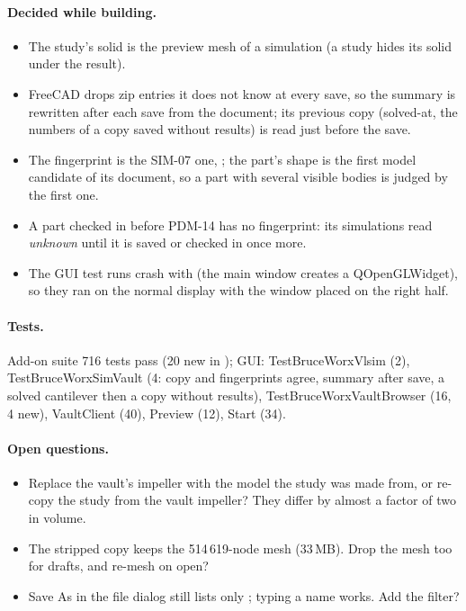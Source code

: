 \paragraph{Decided while building.}
\begin{itemize}[nosep]
  \item The study's solid is the preview mesh of a simulation (a study hides its solid under the result).
  \item FreeCAD drops zip entries it does not know at every save, so the summary is rewritten after each save from the document;
        its previous copy (solved-at, the numbers of a copy saved without results) is read just before the save.
  \item The fingerprint is the SIM-07 one, ; the part's shape is the first model
        candidate of its document, so a part with several visible bodies is judged by the first one.
  \item A part checked in before PDM-14 has no fingerprint: its simulations read \emph{unknown} until it is saved or checked in
        once more.
  \item The GUI test runs crash with  (the main window creates a QOpenGLWidget), so they ran
        on the normal display with the window placed on the right half.
\end{itemize}

\paragraph{Tests.} Add-on suite 716 tests pass (20 new in ); GUI: TestBruceWorxVlsim (2),
TestBruceWorxSimVault (4: copy and fingerprints agree, summary after save, a solved cantilever then a copy without results),
TestBruceWorxVaultBrowser (16, 4 new), VaultClient (40), Preview (12), Start (34).

\paragraph{Open questions.}
\begin{itemize}[nosep]
  \item Replace the vault's impeller with the model the study was made from, or re-copy the study from the vault impeller?
        They differ by almost a factor of two in volume.
  \item The stripped copy keeps the 514\,619-node mesh (33\,MB). Drop the mesh too for drafts, and re-mesh on open?
  \item Save As in the file dialog still lists only ; typing a  name works. Add the filter?
\end{itemize}
